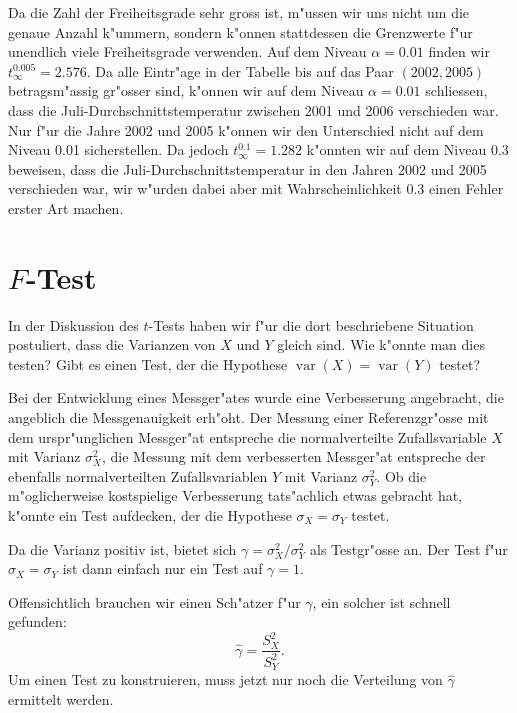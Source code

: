 Da die Zahl der Freiheitsgrade sehr gross ist, m"ussen wir
uns nicht um die genaue Anzahl k"ummern, sondern k"onnen stattdessen
die Grenzwerte f"ur unendlich viele Freiheitsgrade verwenden.
Auf
dem Niveau $\alpha=0.01$ finden wir $t_{\infty}^{0.005}=2.576$.
Da alle Eintr"age in der Tabelle bis auf das Paar $(2002,2005)$
betragsm"assig gr"osser sind, k"onnen wir auf dem Niveau $\alpha=0.01$
schliessen, dass die Juli-Durchschnittstemperatur zwischen
2001 und 2006 verschieden war.
Nur f"ur die Jahre 2002 und 2005
k"onnen wir den Unterschied nicht auf dem Niveau 0.01 sicherstellen.
Da jedoch $t_{\infty}^{0.1}=1.282$ k"onnten wir auf dem Niveau
$0.3$ beweisen, dass die Juli-Durchschnittstemperatur in den
Jahren 2002 und 2005 verschieden war, wir w"urden dabei aber 
mit Wahrscheinlichkeit $0.3$ einen Fehler erster Art machen.

\section{\texorpdfstring{$F$}{F}-Test}
In der Diskussion des $t$-Tests haben wir f"ur die dort beschriebene
Situation postuliert, dass die Varianzen von $X$ und $Y$ gleich sind.
Wie k"onnte man dies testen? Gibt es einen Test, der die Hypothese
$\operatorname{var}(X)=\operatorname{var}(Y)$ testet? 

Bei der Entwicklung eines Messger"ates wurde eine Verbesserung angebracht,
die angeblich die Messgenauigkeit erh"oht.
Der Messung einer Referenzgr"osse
mit dem urspr"unglichen Messger"at entspreche die normalverteilte
Zufallsvariable $X$ mit Varianz $\sigma_X^2$, die Messung mit dem verbesserten
Messger"at entspreche der ebenfalls normalverteilten Zufallsvariablen
$Y$ mit Varianz $\sigma_Y^2$.
Ob die m"oglicherweise kostspielige 
Verbesserung tats"achlich etwas gebracht hat, k"onnte ein Test aufdecken,
der die Hypothese $\sigma_X=\sigma_Y$ testet.

Da die Varianz positiv ist, bietet sich $\gamma=\sigma_X^2/\sigma_Y^2$ als
Testgr"osse an.
Der Test f"ur $\sigma_X=\sigma_Y$ ist dann einfach nur
ein Test auf $\gamma=1$.

Offensichtlich brauchen wir einen Sch"atzer f"ur $\gamma$, ein solcher ist
schnell gefunden:
\begin{equation}
\hat\gamma=\frac{S_X^2}{S_Y^2}.
\label{ftest-gamma-schaetzer}
\end{equation}
Um einen Test zu konstruieren, muss jetzt nur noch die Verteilung von
$\hat\gamma$ ermittelt werden.

